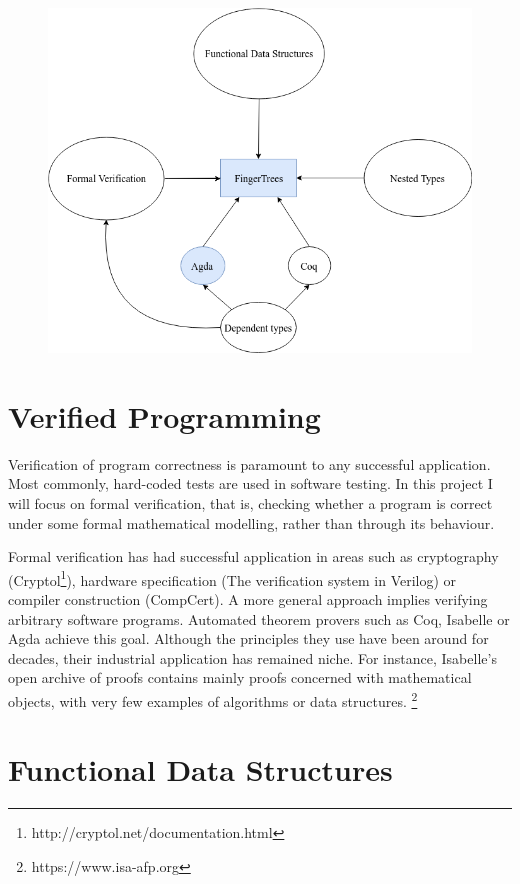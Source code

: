 \documentclass[12pt,twoside,notitlepage]{report}
\begin{document}
\begin{figure}
\centering 

\includegraphics[scale=0.6]{flow}
\end{figure}
\section{Verified Programming}

Verification of program correctness is paramount to any successful application. Most commonly, hard-coded tests are used in software testing. In this project I will focus on formal verification, that is, checking whether a program is correct under some formal mathematical modelling, rather than through its behaviour.
	
Formal verification has had successful application in areas such as cryptography (Cryptol\footnote{http://cryptol.net/documentation.html}), hardware specification (The verification system in Verilog) or compiler construction (CompCert\cite{compcert}). 
A more general approach implies verifying arbitrary software programs. Automated theorem provers such as Coq, Isabelle or Agda achieve this goal. Although the principles they use have been around for decades, their industrial application has remained niche. For instance, Isabelle’s open archive of proofs contains mainly proofs concerned with mathematical objects, with very few examples of algorithms or data structures. \footnote{https://www.isa-afp.org}
	
\section{Functional Data Structures}
\end{document}
